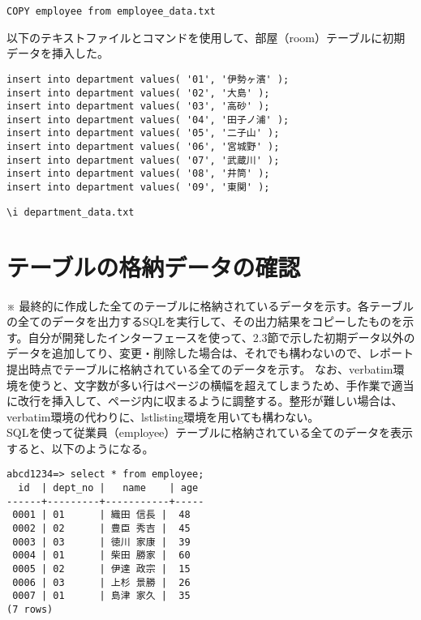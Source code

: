 \documentclass[a4j,12pt]{jreport}
\begin{document}
\begin{lstlisting}[caption=横綱テーブルへの初期データの挿入]
COPY employee from employee_data.txt
\end{lstlisting}
\vspace{3mm}

以下のテキストファイルとコマンドを使用して、部屋（room）テーブルに初期データを挿入した。

\begin{lstlisting}[caption=部屋テーブルへの初期データの挿入（room\_data.txt）]
insert into department values( '01', '伊勢ヶ濱' );
insert into department values( '02', '大島' );
insert into department values( '03', '高砂' );
insert into department values( '04', '田子ノ浦' );
insert into department values( '05', '二子山' );
insert into department values( '06', '宮城野' );
insert into department values( '07', '武蔵川' );
insert into department values( '08', '井筒' );
insert into department values( '09', '東関' );
\end{lstlisting}

\begin{lstlisting}[caption=部門テーブルへの初期データの挿入]
\i department_data.txt
\end{lstlisting}


\section{テーブルの格納データの確認}

※ 最終的に作成した全てのテーブルに格納されているデータを示す。各テーブルの全てのデータを出力するSQLを実行して、その出力結果をコピーしたものを示す。自分が開発したインターフェースを使って、2.3節で示した初期データ以外のデータを追加してり、変更・削除した場合は、それでも構わないので、レポート提出時点でテーブルに格納されている全てのデータを示す。
なお、verbatim環境を使うと、文字数が多い行はページの横幅を超えてしまうため、手作業で適当に改行を挿入して、ページ内に収まるように調整する。整形が難しい場合は、verbatim環境の代わりに、lstlisting環境を用いても構わない。\\

SQLを使って従業員（employee）テーブルに格納されている全てのデータを表示すると、以下のようになる。

\begin{verbatim}
abcd1234=> select * from employee;
  id  | dept_no |   name    | age 
------+---------+-----------+-----
 0001 | 01      | 織田 信長 |  48
 0002 | 02      | 豊臣 秀吉 |  45
 0003 | 03      | 徳川 家康 |  39
 0004 | 01      | 柴田 勝家 |  60
 0005 | 02      | 伊達 政宗 |  15
 0006 | 03      | 上杉 景勝 |  26
 0007 | 01      | 島津 家久 |  35
(7 rows)
\end{verbatim}
\vspace{3mm}
\end{document}
